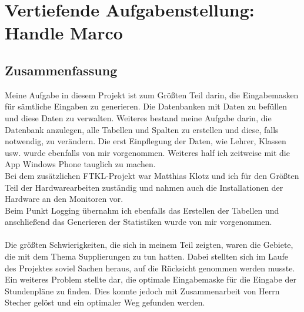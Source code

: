 \chapter[Handle]{Vertiefende Aufgabenstellung: Handle Marco}

\section{Zusammenfassung}
Meine Aufgabe in diesem Projekt ist zum Größten Teil darin, die Eingabemasken für sämtliche Eingaben zu generieren. Die Datenbanken mit Daten zu befüllen und diese Daten zu verwalten. Weiteres bestand meine Aufgabe darin, die Datenbank anzulegen, alle Tabellen und Spalten zu erstellen und diese, falls notwendig, zu verändern. Die erst Einpflegung der Daten, wie Lehrer, Klassen usw. wurde ebenfalls von mir vorgenommen. Weiteres half ich zeitweise mit die App Windows Phone tauglich zu machen.\\
Bei dem zusätzlichen FTKL-Projekt war Matthias Klotz und ich für den Größten Teil der Hardwarearbeiten zuständig und nahmen auch die Installationen der Hardware an den Monitoren vor.\\
Beim Punkt Logging übernahm ich ebenfalls das Erstellen der Tabellen und anschließend das Generieren der Statistiken wurde von mir vorgenommen.\\
\\
Die größten Schwierigkeiten, die sich in meinem Teil zeigten, waren die Gebiete, die mit dem Thema Supplierungen zu tun hatten. Dabei stellten sich im Laufe des Projektes soviel Sachen heraus, auf die Rücksicht genommen werden musste.\\
Ein weiteres Problem stellte dar, die optimale Eingabemaske für die Eingabe der Stundenpläne zu finden. Dies konnte jedoch mit Zusammenarbeit von Herrn Stecher gelöst und ein optimaler Weg gefunden werden. 
